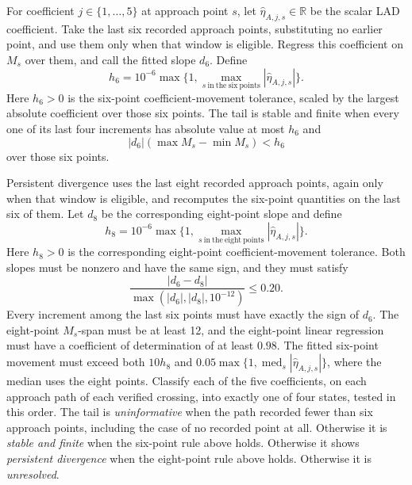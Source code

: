 \documentclass[11pt]{article}
\begin{document}
For coefficient \(j\in\{1,\ldots,5\}\) at approach point \(s\), let
\(\widehat\eta_{A,j,s}\in\mathbb R\) be the scalar LAD coefficient. Take the last six recorded
approach points, substituting no earlier point, and use them only when that window is eligible.
Regress this coefficient on \(M_s\) over them, and call the fitted slope \(d_6\). Define
\begin{equation*}
 h_6=10^{-6}\max\{1,\max_{s\ \mathrm{in\ the\ six\ points}}|\widehat\eta_{A,j,s}|\}.
\end{equation*}
Here \(h_6>0\) is the six-point coefficient-movement tolerance, scaled by the largest absolute
coefficient over those six points.
The tail is stable and finite when every one of its last four increments has absolute value at most
\(h_6\) and
\begin{equation*}
 |d_6|(\max M_s-\min M_s)<h_6
\end{equation*}
over those six points.

Persistent divergence uses the last eight recorded approach points, again only when that window is
eligible, and recomputes the six-point quantities on the last six of them. Let \(d_8\) be the corresponding
eight-point slope and define
\begin{equation*}
 h_8=10^{-6}\max\{1,\max_{s\ \mathrm{in\ the\ eight\ points}}|\widehat\eta_{A,j,s}|\}.
\end{equation*}
Here \(h_8>0\) is the corresponding eight-point coefficient-movement tolerance.
Both slopes must be nonzero and have the same sign, and they must satisfy
\begin{equation*}
 \frac{|d_6-d_8|}{\max(|d_6|,|d_8|,10^{-12})}\le0.20.
\end{equation*}
Every increment among the last six points must have exactly the sign of \(d_6\). The eight-point
\(M_s\)-span must be at least 12, and the eight-point linear regression must have a coefficient of determination of at least \(0.98\).
The fitted six-point movement must exceed both \(10h_8\) and
\(0.05\max\{1,\operatorname{med}_s|\widehat\eta_{A,j,s}|\}\), where the median uses the eight
points. Classify each of the five coefficients, on each approach path of each verified crossing, into
exactly one of four states, tested in this order. The tail is \emph{uninformative} when the path
recorded fewer than six approach points, including the case of no recorded point at all. Otherwise it
is \emph{stable and finite} when the six-point rule above holds. Otherwise it shows \emph{persistent
divergence} when the eight-point rule above holds. Otherwise it is \emph{unresolved}.
\end{document}
